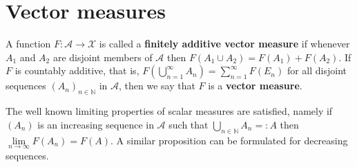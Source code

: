 \documentclass[a4paper, 12pt]{article}
\begin{document}
\section{Vector measures}\label{sec:vectormeasures}
A function $F\colon \mathcal{A} \to \mathcal{X}$ is called a \textbf{finitely additive vector measure} if whenever $A_1$ and $A_2$ are disjoint members of $\mathcal{A}$ then $F(A_1 \cup A_2) = F(A_1) + F(A_2)$. If $F$ is countably additive, that is, $F\left( \bigcup^{\infty}_{n=1} A_n \right) = \sum^{\infty}_{n=1}F(E_n)$ for all disjoint sequences $(A_n)_{n \in \mathbb{N}}$ in $\mathcal{A}$, then we say that $F$ is a \textbf{vector measure}.


The well known limiting properties of scalar measures are satisfied, namely if $(A_n)$ is an increasing sequence in $\mathcal{A}$ such that $\bigcup_{n \in \mathbb{N}} A_n =: A$ then $\lim\limits_{n \to \infty} F(A_n) = F(A)$. A similar proposition can be formulated for decreasing sequences.
\end{document}
